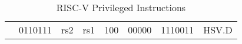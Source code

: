 \begin{table}[p]
\begin{small}
\begin{center}
\begin{tabular}{p{0in}p{0.4in}p{0.05in}p{0.05in}p{0.05in}p{0.05in}p{0.4in}p{0.6in}p{0.4in}p{0.6in}p{0.7in}l}
&
\multicolumn{4}{|c|}{0110111} &
\multicolumn{2}{c|}{rs2} &
\multicolumn{1}{c|}{rs1} &
\multicolumn{1}{c|}{100} &
\multicolumn{1}{c|}{00000} &
\multicolumn{1}{c|}{1110011} & HSV.D \\
\cline{2-11}


\end{tabular}
\end{center}
\end{small}
\caption{RISC-V Privileged Instructions}
\end{table}
  
